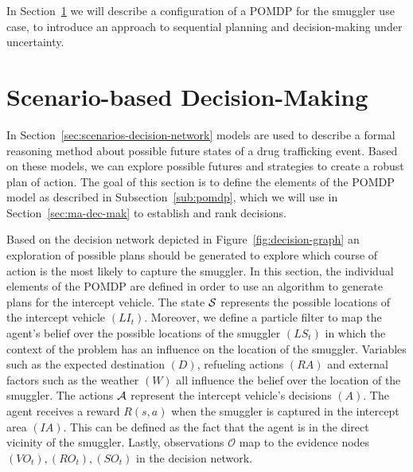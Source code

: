 \documentclass[conference]{IEEEtran}
\begin{document}
In Section~\ref{sec:scenario-based-dm} we will describe a configuration of a POMDP for the smuggler use case, to introduce an approach to sequential planning and decision-making under uncertainty. 



\section{Scenario-based Decision-Making}
\label{sec:scenario-based-dm}

In Section~\ref{sec:scenarios-decision-network} models are used to describe a formal reasoning method about possible future states of a drug trafficking event. Based on these models, we can explore possible futures and strategies to create a robust plan of action. The goal of this section is to define the elements of the POMDP model as described in Subsection~\ref{sub:pomdp}, which we will use in Section~\ref{sec:ma-dec-mak} to establish and rank decisions.

Based on the decision network depicted in Figure~\ref{fig:decision-graph} an exploration of possible plans should be generated to explore which course of action is the most likely to capture the smuggler. In this section, the individual elements of the POMDP are defined in order to use an algorithm to generate plans for the intercept vehicle. The state $\S$ represents the possible locations of the intercept vehicle $(LI_t)$. Moreover, we define a particle filter to map the agent's belief over the possible locations of the smuggler $(LS_t)$ in which the context of the problem has an influence on the location of the smuggler. Variables such as the expected destination $(D)$, refueling actions $(RA)$ and external factors such as the weather $(W)$ all influence the belief over the location of the smuggler. The actions $\A$ represent the intercept vehicle's decisions $(A)$. The agent receives a reward $R(s,a)$ when the smuggler is captured in the intercept area $(IA)$. This can be defined as the fact that the agent is in the direct vicinity of the smuggler. Lastly, observations $\mathcal{O}$ map to the evidence nodes $(VO_t), (RO_t), (SO_t)$ in the decision network.
\end{document}
